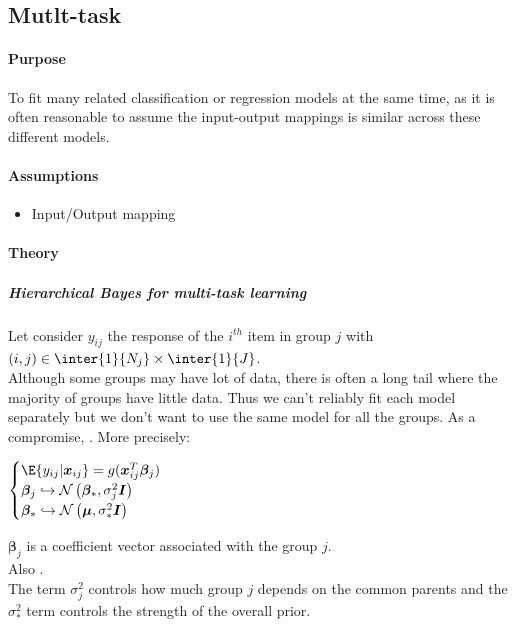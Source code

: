 \subsection{Mutlt-task}
\paragraph{Purpose}
To fit many related classification or regression models at the same time, as it is often reasonable
to assume the input-output mappings is similar across these different models.

\paragraph{Assumptions}
\begin{itemize}
    \item Input/Output mapping
\end{itemize}

\paragraph{Theory}
\subparagraph{Hierarchical Bayes for multi-task learning}
Let consider $y_{ij}$ the response of the $i^{th}$ item in group $j$ with $(i,j)\in\inter{1}{N_{j}}
\times\inter{1}{J}$.\\
Although some groups may have lot of data, there is often a long tail where the majority of groups
have little data. Thus we can't reliably fit each model separately but we don't want to use the
same model for all the groups. As a compromise, . More precisely:
\begin{center}
    $\begin{cases}
        \E{y_{ij}|\bm{x}_{ij}} = g(\bm{x}_{ij}^{T}\bm{\beta}_{j}) \\
        \bm{\beta}_{j} \hookrightarrow \mathcal{N}\left(\bm{\beta}_{*}, \sigma_{j}^{2}\bm{I}\right)\\
        \bm{\beta}_{*} \hookrightarrow \mathcal{N}\left(\bm{\mu}, \sigma_{*}^{2}\bm{I}\right)
    \end{cases}$
\end{center}
$\bm{\beta}_{j}$ is a coefficient vector associated with the group $j$.\\
Also .\\
The term $\sigma_{j}^{2}$ controls how much group $j$ depends on the common parents and the 
$\sigma_{*}^{2}$ term controls the strength of the overall prior.
